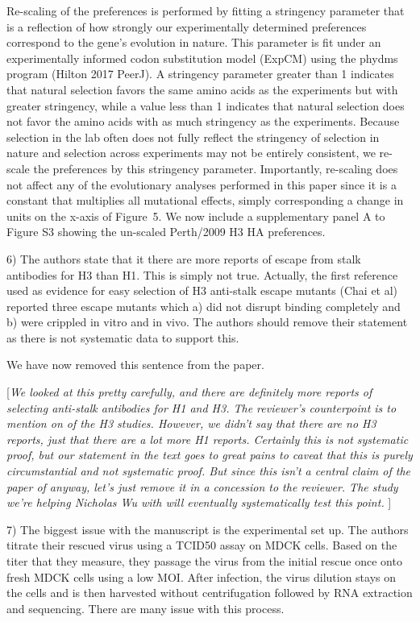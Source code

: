 \documentclass[11pt, oneside]{article}   	%
\newcommand{\comment}[1]{{\color{red}[\textsl{#1}]}}
\newcommand{\response}[1]{{\color{black}#1}}
\begin{document}
\response{Re-scaling of the preferences is performed by fitting a stringency parameter that is a reflection of how strongly our experimentally determined preferences correspond to the gene's evolution in nature.
This parameter is fit under an experimentally informed codon substitution model (ExpCM) using the phydms program (Hilton 2017 PeerJ).
A stringency parameter greater than 1 indicates that natural selection favors the same amino acids as the experiments but with greater stringency, while a value less than 1 indicates that natural selection does not favor the amino acids with as much stringency as the experiments.
Because selection in the lab often does not fully reflect the stringency of selection in nature and selection across experiments may not be entirely consistent, we re-scale the preferences by this stringency parameter.
Importantly, re-scaling does not affect any of the evolutionary analyses performed in this paper since it is a constant that multiplies all mutational effects, simply corresponding a change in units on the x-axis of Figure~5.
We now include a supplementary panel A to Figure S3 showing the un-scaled Perth/2009 H3 HA preferences.
}

6) The authors state that it there are more reports of escape from stalk antibodies for H3 than H1. This is simply not true. Actually, the first reference used as evidence for easy selection of H3 anti-stalk escape mutants (Chai et al) reported three escape mutants which a) did not disrupt binding completely and b) were crippled in vitro and in vivo. The authors should remove their statement as there is not systematic data to support this. 

\response{We have now removed this sentence from the paper.}

\comment{We looked at this pretty carefully, and there are definitely more reports of selecting anti-stalk antibodies for H1 and H3.
The reviewer's counterpoint is to mention on of the H3 studies. 
However, we didn't say that there are no H3 reports, just that there are a lot more H1 reports.
Certainly this is not systematic proof, but our statement in the text goes to great pains to caveat that this is purely circumstantial and not systematic proof.
But since this isn't a central claim of the paper of anyway, let's just remove it in a concession to the reviewer.
The study we're helping Nicholas Wu with will eventually systematically test this point.
}

7) The biggest issue with the manuscript is the experimental set up. The authors titrate their rescued virus using a TCID50 assay on MDCK cells. Based on the titer that they measure, they passage the virus from the initial rescue once onto fresh MDCK cells using a low MOI. After infection, the virus dilution stays on the cells and is then harvested without centrifugation followed by RNA extraction and sequencing. There are many issue with this process. 
\end{document}
